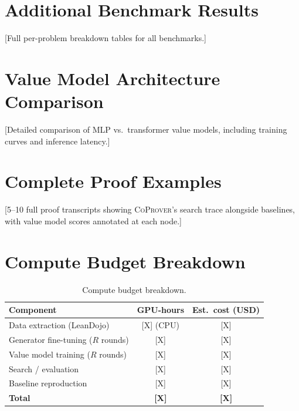 \documentclass{article}
\newcommand{\coprover}{\textsc{CoProver}}
\begin{document}
\section{Additional Benchmark Results}
\label{app:additional}

[Full per-problem breakdown tables for all benchmarks.]

\section{Value Model Architecture Comparison}
\label{app:architecture}

[Detailed comparison of MLP vs.\ transformer value models, including training curves and inference latency.]

\section{Complete Proof Examples}
\label{app:proofs}

[5--10 full proof transcripts showing \coprover{}'s search trace alongside baselines, with value model scores annotated at each node.]

\section{Compute Budget Breakdown}
\label{app:compute}

\begin{table}[h]
\centering
\caption{Compute budget breakdown.}
\vspace{0.5em}
\begin{tabular}{lcc}
\toprule
\textbf{Component} & \textbf{GPU-hours} & \textbf{Est.\ cost (USD)} \\
\midrule
Data extraction (LeanDojo) & [X] (CPU) & [X] \\
Generator fine-tuning ($R$ rounds) & [X] & [X] \\
Value model training ($R$ rounds) & [X] & [X] \\
Search / evaluation & [X] & [X] \\
Baseline reproduction & [X] & [X] \\
\midrule
\textbf{Total} & \textbf{[X]} & \textbf{[X]} \\
\bottomrule
\end{tabular}
\end{table}
\end{document}
